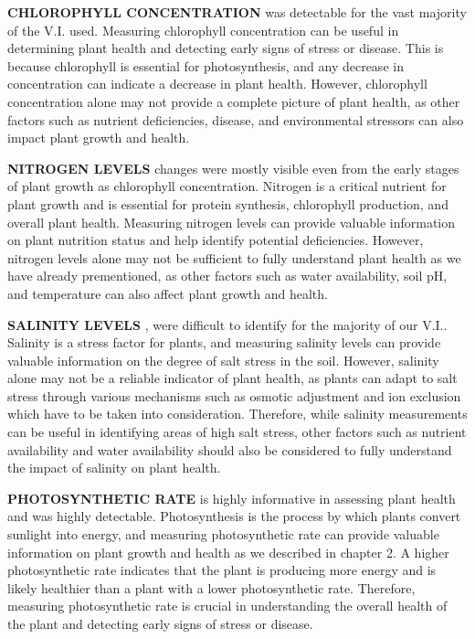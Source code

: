 \documentclass{article}
\begin{document}
                    \textbf{CHLOROPHYLL CONCENTRATION} was detectable for the vast majority of the V.I. used. Measuring chlorophyll concentration can be useful in determining plant health and detecting early signs of stress or disease. This is because chlorophyll is essential for photosynthesis, and any decrease in concentration can indicate a decrease in plant health. However, chlorophyll concentration alone may not provide a complete picture of plant health, as other factors such as nutrient deficiencies, disease, and environmental stressors can also impact plant growth and health.\par
                    \vspace*{1\baselineskip}
                    
                    \textbf{NITROGEN LEVELS} changes were mostly visible even from the early stages of plant growth as chlorophyll concentration. Nitrogen is a critical nutrient for plant growth and is essential for protein synthesis, chlorophyll production, and overall plant health. Measuring nitrogen levels can provide valuable information on plant nutrition status and help identify potential deficiencies. However, nitrogen levels alone may not be sufficient to fully understand plant health as we have already prementioned, as other factors such as water availability, soil pH, and temperature can also affect plant growth and health.\par
                    \vspace*{1\baselineskip}
                    
                    \textbf{SALINITY LEVELS} , were difficult to identify for the majority of our V.I.. Salinity is a stress factor for plants, and measuring salinity levels can provide valuable information on the degree of salt stress in the soil. However, salinity alone may not be a reliable indicator of plant health, as plants can adapt to salt stress through various mechanisms such as osmotic adjustment and ion exclusion which have to be taken into consideration. Therefore, while salinity measurements can be useful in identifying areas of high salt stress, other factors such as nutrient availability and water availability should also be considered to fully understand the impact of salinity on plant health.\par
                    \vspace*{1\baselineskip}
                    
                    \textbf{PHOTOSYNTHETIC RATE} is highly informative in assessing plant health and was highly detectable. Photosynthesis is the process by which plants convert sunlight into energy, and measuring photosynthetic rate can provide valuable information on plant growth and health as we described in chapter 2. A higher photosynthetic rate indicates that the plant is producing more energy and is likely healthier than a plant with a lower photosynthetic rate. Therefore, measuring photosynthetic rate is crucial in understanding the overall health of the plant and detecting early signs of stress or disease.\par
                    \vspace*{1\baselineskip}
                    
\end{document}
